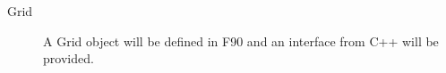 

\begin{description}

\item [Grid] A Grid object will be defined in F90 and an interface
from C++ will be provided.

\end{description}



